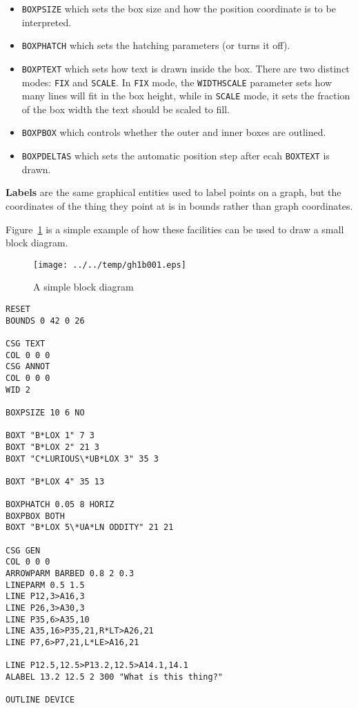 \documentclass[a4paper,twoside,11pt]{article}
\makeatletter
\def\maxwidth{%
  \ifdim\Gin@nat@width>\linewidth
    \linewidth
  \else
    \Gin@nat@width
  \fi
}
\newcommand{\newpara}{\par\vspace{4mm}\noindent}
\makeatother
\begin{document}
\begin{itemize}
\item
  \texttt{BOXPSIZE} which sets the box size and how the position
  coordinate is to be interpreted.
\item
  \texttt{BOXPHATCH} which sets the hatching parameters (or turns it
  off).
\item
  \texttt{BOXPTEXT} which sets how text is drawn inside the box. There
  are two distinct modes: \texttt{FIX} and \texttt{SCALE}. In
  \texttt{FIX} mode, the \texttt{WIDTHSCALE} parameter sets how many
  lines will fit in the box height, while in \texttt{SCALE} mode, it
  sets the fraction of the box width the text should be scaled to fill.
\item
  \texttt{BOXPBOX} which controls whether the outer and inner boxes are
  outlined.
\item
  \texttt{BOXPDELTAS} which sets the automatic position step after ecah
  \texttt{BOXTEXT} is drawn.
\end{itemize}

\newpara
\textbf{Labels} are the same graphical entities used to label points on
a graph, but the coordinates of the thing they point at is in bounds
rather than graph coordinates.

\newpara
Figure~\ref{fig:gh1b001} is a simple example of how
these facilities can be used to draw a
small block diagram.

\begin{figure}
  \centering
  \texttt{[image: ../../temp/gh1b001.eps]}
  \caption{A simple block diagram}
  \label{fig:gh1b001}
\end{figure}

\begin{lstlisting}
RESET
BOUNDS 0 42 0 26

CSG TEXT
COL 0 0 0
CSG ANNOT
COL 0 0 0
WID 2

BOXPSIZE 10 6 NO

BOXT "B*LOX 1" 7 3
BOXT "B*LOX 2" 21 3
BOXT "C*LURIOUS\*UB*LOX 3" 35 3

BOXT "B*LOX 4" 35 13

BOXPHATCH 0.05 8 HORIZ
BOXPBOX BOTH
BOXT "B*LOX 5\*UA*LN ODDITY" 21 21

CSG GEN
COL 0 0 0
ARROWPARM BARBED 0.8 2 0.3
LINEPARM 0.5 1.5
LINE P12,3>A16,3
LINE P26,3>A30,3
LINE P35,6>A35,10
LINE A35,16>P35,21,R*LT>A26,21
LINE P7,6>P7,21,L*LE>A16,21

LINE P12.5,12.5>P13.2,12.5>A14.1,14.1
ALABEL 13.2 12.5 2 300 "What is this thing?"

OUTLINE DEVICE
\end{lstlisting}
\end{document}
